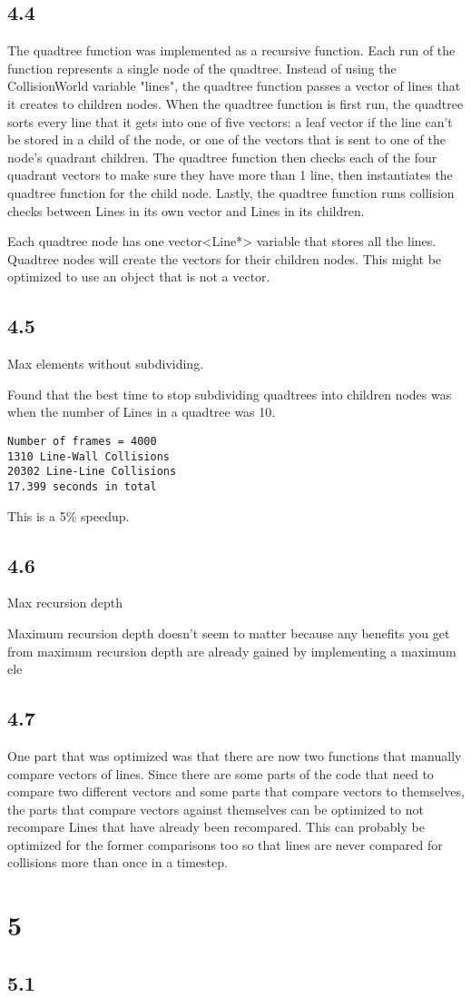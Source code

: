 \documentclass[12pt]{article}
\begin{document}
\subsection{4.4}
The quadtree function was implemented as a recursive function.  Each run of the 
function represents a single node of the quadtree.  Instead of using the 
CollisionWorld variable "lines", the quadtree function passes a vector of lines 
that it creates to children nodes.  When the quadtree function is first run, 
the quadtree sorts every line that it gets into one of five vectors: a leaf 
vector if the line can't be stored in a child of the node, or one of the vectors 
that is sent to one of the node's quadrant children.  The quadtree function then 
checks each of the four quadrant vectors to make sure they have more than 1 line, 
then instantiates the quadtree function for the child node.  Lastly, the quadtree 
function runs collision checks between Lines in its own vector and Lines in its 
children.  

Each quadtree node has one 
vector<Line*> variable that stores all the lines.  Quadtree nodes will create 
the vectors for their children nodes.  This might be optimized to use an object 
that is not a vector.


\subsection{4.5}
Max elements without subdividing.

Found that the best time to stop subdividing quadtrees into children nodes 
was when the number of Lines in a quadtree was 10.  
\begin{verbatim}
Number of frames = 4000
1310 Line-Wall Collisions
20302 Line-Line Collisions
17.399 seconds in total
\end{verbatim}
This is a 5\% speedup.  


\subsection{4.6}
Max recursion depth

Maximum recursion depth doesn't seem to matter because any benefits you get 
from maximum recursion depth are already gained by implementing a maximum ele


\subsection{4.7}
One part that was optimized was that there are now two functions that manually 
compare vectors of lines.  Since there are some parts of the code that need to 
compare two different vectors and some parts that compare vectors to themselves, 
the parts that compare vectors against themselves can be optimized to not 
recompare Lines that have already been recompared.  This can probably be 
optimized for the former comparisons too so that lines are never compared for 
collisions more than once in a timestep.  




\section{5}
\subsection{5.1}
\end{document}
